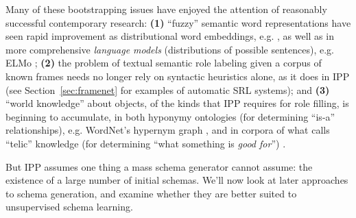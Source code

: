 Many of these bootstrapping issues have enjoyed the attention of reasonably successful contemporary research: \textbf{(1)} ``fuzzy'' semantic word representations have seen rapid improvement as distributional word embeddings, e.g. \citep{mikolov2013}, as well as in more comprehensive \textit{language models} (distributions of possible sentences), e.g. ELMo \citep{elmo}; \textbf{(2)} the problem of textual semantic role labeling given a corpus of known frames needs no longer rely on syntactic heuristics alone, as it does in IPP (see Section~\vref{sec:framenet} for examples of automatic SRL systems); and \textbf{(3)} ``world knowledge'' about objects, of the kinds that IPP requires for role filling, is beginning to accumulate, in both hyponymy ontologies (for determining ``is-a'' relationships), e.g. WordNet's hypernym graph \citep{miller1995wordnet}, and in corpora of what \citet{pustejovsky1991generative} calls ``telic'' knowledge (for determining ``what something is \textit{good for}'') \citep{yamada2004automatic}.

But IPP assumes one thing a mass schema generator cannot assume: the existence of a large number of initial schemas. We'll now look at later approaches to schema generation, and examine whether they are better suited to unsupervised schema learning.